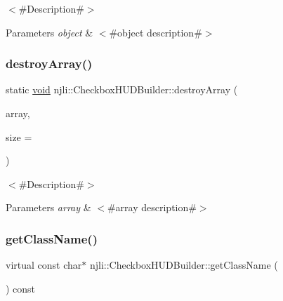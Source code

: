 $<$\#\+Description\#$>$


\begin{DoxyParams}{Parameters}
{\em object} & $<$\#object description\#$>$ \\
\hline
\end{DoxyParams}
\mbox{\label{classnjli_1_1_checkbox_h_u_d_builder_a7bf0a141fc13c9fd136756fa68d97a9b}} 
\subsubsection{\texorpdfstring{destroy\+Array()}{destroyArray()}}
{\footnotesize\ttfamily static \mbox{\hyperlink{_thread_8h_af1e856da2e658414cb2456cb6f7ebc66}{void}} njli\+::\+Checkbox\+H\+U\+D\+Builder\+::destroy\+Array (\begin{DoxyParamCaption}\item[{\mbox{\hyperlink{classnjli_1_1_checkbox_h_u_d_builder}{Checkbox\+H\+U\+D\+Builder}} $\ast$$\ast$}]{array,  }\item[{const \mbox{\hyperlink{_util_8h_a10e94b422ef0c20dcdec20d31a1f5049}{u32}}}]{size = {} }\end{DoxyParamCaption})\hspace{0.3cm}{\ttfamily [static]}}

$<$\#\+Description\#$>$


\begin{DoxyParams}{Parameters}
{\em array} & $<$\#array description\#$>$ \\
\hline
\end{DoxyParams}
\mbox{\label{classnjli_1_1_checkbox_h_u_d_builder_ab71e250c4167ea8d8d348c3af70e6b80}} 
\subsubsection{\texorpdfstring{get\+Class\+Name()}{getClassName()}}
{\footnotesize\ttfamily virtual const char$\ast$ njli\+::\+Checkbox\+H\+U\+D\+Builder\+::get\+Class\+Name (\begin{DoxyParamCaption}{ }\end{DoxyParamCaption}) const\hspace{0.3cm}{\ttfamily [virtual]}}

